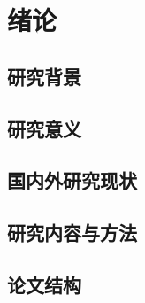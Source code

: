 \section{绪论}


\subsection{研究背景}


\subsection{研究意义}


\subsection{国内外研究现状}


\subsection{研究内容与方法}


\subsection{论文结构}

